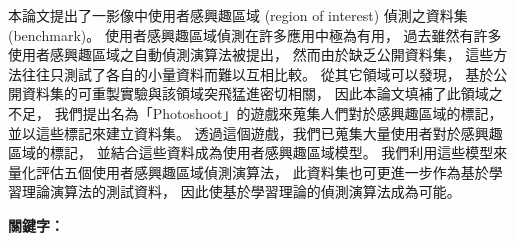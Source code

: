 \begin{abstractzh}
本論文提出了一影像中使用者感興趣區域 (region of interest)
偵測之資料集 (benchmark)。
使用者感興趣區域偵測在許多應用中極為有用，
過去雖然有許多使用者感興趣區域之自動偵測演算法被提出，
然而由於缺乏公開資料集，
這些方法往往只測試了各自的小量資料而難以互相比較。
從其它領域可以發現，
基於公開資料集的可重製實驗與該領域突飛猛進密切相關，
因此本論文填補了此領域之不足，
我們提出名為「Photoshoot」的遊戲來蒐集人們對於感興趣區域的標記，
並以這些標記來建立資料集。
透過這個遊戲，我們已蒐集大量使用者對於感興趣區域的標記，
並結合這些資料成為使用者感興趣區域模型。
我們利用這些模型來量化評估五個使用者感興趣區域偵測演算法，
此資料集也可更進一步作為基於學習理論演算法的測試資料，
因此使基於學習理論的偵測演算法成為可能。

\bigbreak
\noindent \textbf{關鍵字：}{\, \makeatletter \@keywordszh \makeatother}
\end{abstractzh}

